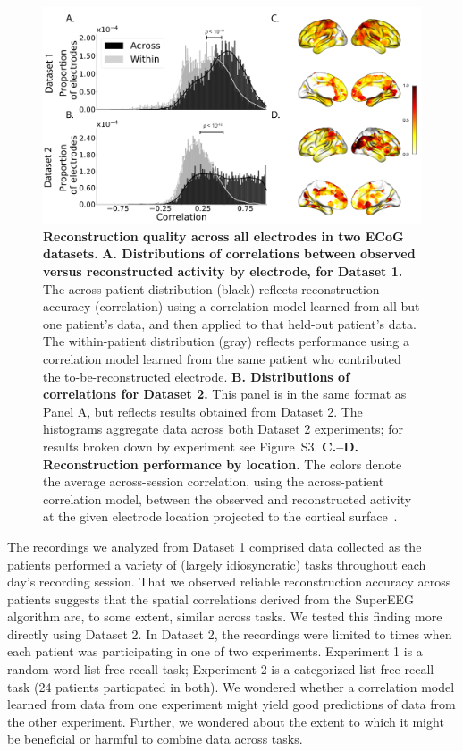 \documentclass[11pt]{article}
\newcommand{\perexptaskreconseparated}{S3}
\begin{document}
\begin{figure}
  \centering
  \includegraphics[width=\textwidth]{figs/corrmap}
  \caption{\textbf{Reconstruction quality across all electrodes in two
      ECoG datasets.}  \textbf{A. Distributions of correlations
      between observed versus reconstructed activity by electrode, for
      Dataset 1.}  The across-patient distribution (black) reflects
    reconstruction accuracy (correlation) using a correlation model
    learned from all but one patient's data, and then applied to that
    held-out patient's data.  The within-patient distribution (gray)
    reflects performance using a correlation model learned from the same
    patient who contributed the to-be-reconstructed electrode.
    \textbf{B. Distributions of correlations for Dataset 2.}  This
    panel is in the same format as Panel A, but reflects results
    obtained from Dataset 2.  The histograms aggregate data across
    both Dataset 2 experiments; for results broken down by experiment
    see Figure~\perexptaskreconseparated. \textbf{C.--D.  Reconstruction
      performance by location.} The colors denote the average across-session
    correlation, using the across-patient correlation model, between
    the observed and reconstructed activity at the given electrode
    location projected to the cortical surface~\citep{CombEtal19}.}
  \label{fig:corrmap}
\end{figure}

The recordings we analyzed from Dataset 1 comprised data collected as
the patients performed a variety of (largely idiosyncratic) tasks
throughout each day's recording session.  That we observed reliable
reconstruction accuracy across patients suggests that the spatial
correlations derived from the SuperEEG algorithm are, to some extent,
similar across tasks.  We tested this finding more directly using
Dataset 2.  In Dataset 2, the recordings were limited to times when
each patient was participating in one of two experiments.  Experiment
1 is a random-word list free recall task; Experiment 2 is a
categorized list free recall task (24 patients particpated in both).  We wondered whether a correlation
model learned from data from one experiment might yield good
predictions of data from the other experiment.  Further, we wondered
about the extent to which it might be beneficial or harmful to combine
data across tasks.
\end{document}
